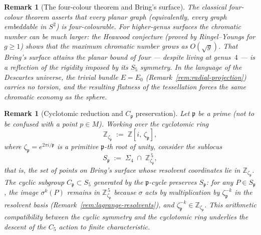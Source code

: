 \documentclass[12pt,a4paper]{report}
\newtheorem{remark}[theorem]{Remark}
\begin{document}
\begin{remark}[The four-colour theorem and Bring's surface]
\label{rem:four-colour-theorem}
The classical four-colour theorem asserts that every planar graph (equivalently,
every graph embeddable in $S^2$) is four-colourable.  For higher-genus
surfaces the chromatic number can be much larger: the Heawood conjecture
(proved by Ringel--Youngs for $g\geq 1$) shows that the maximum chromatic
number grows as $O(\sqrt{g})$.  That Bring's surface attains the planar
bound of four --- despite living at genus~$4$ --- is a reflection of the
rigidity imposed by its $S_5$ symmetry.  In the language of the Descartes
universe, the trivial bundle $E=E_0$
(Remark~\ref{rem:radial-projection}) carries no torsion, and the resulting
flatness of the tessellation forces the same chromatic economy as the
sphere.
\end{remark}

\begin{remark}[Cyclotomic reduction and $C_{\mathfrak{p}}$ preservation]
\label{rem:cyclotomic-reduction}
Let $\mathfrak{p}$ be a prime (not to be confused with a point $p\in M$).
Working over the cyclotomic ring
\begin{equation}\label{eq:cyclotomic-ring}
  \mathbb{Z}_{\zeta_{\mathfrak{p}}}
  \;:=\;\mathbb{Z}[i,\,\zeta_{\mathfrak{p}}],
\end{equation}
where $\zeta_{\mathfrak{p}}=e^{2\pi i/\mathfrak{p}}$ is a primitive
$\mathfrak{p}$-th root of unity, consider the sublocus
\[
  S_{\mathfrak{p}}
  \;:=\;
  \Sigma_4\;\cap\;\mathbb{Z}_{\zeta_{\mathfrak{p}}}^{\,5},
\]
that is, the set of points on Bring's surface whose resolvent coordinates
lie in $\mathbb{Z}_{\zeta_{\mathfrak{p}}}$.  The cyclic subgroup
$C_{\mathfrak{p}}\subset S_5$ generated by the $\mathfrak{p}$-cycle preserves
$S_{\mathfrak{p}}$: for any $P\in S_{\mathfrak{p}}$, the image
$\sigma^k(P)$ remains in $\mathbb{Z}_{\zeta_{\mathfrak{p}}}^{\,5}$ because
$\sigma$ acts by multiplication by $\zeta_{\mathfrak{p}}^{-k}$ in the
resolvent basis (Remark~\ref{rem:lagrange-resolvents}), and
$\zeta_{\mathfrak{p}}^{-k}\in\mathbb{Z}_{\zeta_{\mathfrak{p}}}$.  This
arithmetic compatibility between the cyclic symmetry and the cyclotomic ring
underlies the descent of the $C_5$ action to finite characteristic.
\end{remark}
\end{document}
